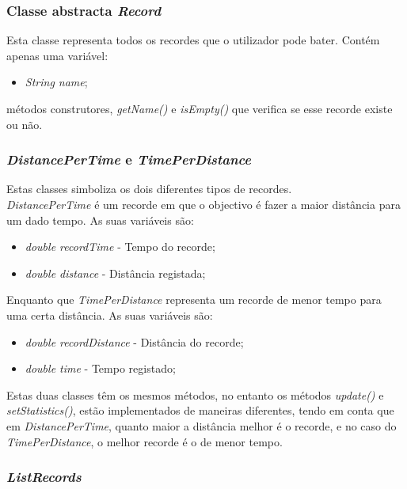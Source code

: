 \documentclass[10pt,notitlepage]{article}
\begin{document}
\subsubsection{Classe abstracta \textit{Record}}

Esta classe representa todos os recordes que o utilizador pode bater. Contém apenas uma variável:
\begin{itemize}
\item \textit{String name};
\end{itemize}
métodos construtores, \textit{getName()} e \textit{isEmpty()} que verifica se esse recorde existe ou não.


\subsubsection{\textit{DistancePerTime} e \textit{TimePerDistance}}
Estas classes simboliza os dois diferentes tipos de recordes.\\

\textit{DistancePerTime} é um recorde em que o objectivo é fazer a maior distância para um dado tempo.  
As suas variáveis são:
\begin{itemize}
\item \textit{double recordTime} - Tempo do recorde;
\item \textit{double distance} - Distância registada;
\end{itemize}

Enquanto que \textit{TimePerDistance} representa um recorde de menor tempo para uma certa distância.
As suas variáveis são:
\begin{itemize}
\item \textit{double recordDistance} - Distância do recorde;
\item \textit{double time} - Tempo registado;
\end{itemize}
Estas duas classes têm os mesmos métodos, no entanto os métodos \textit{update()} e \textit{setStatistics()}, estão implementados de maneiras diferentes, tendo em conta que em \textit{DistancePerTime}, quanto maior a distância melhor é o recorde, e no caso do \textit{TimePerDistance},  o melhor recorde é o de menor tempo.


\subsubsection{\textit{ListRecords}}
\end{document}
